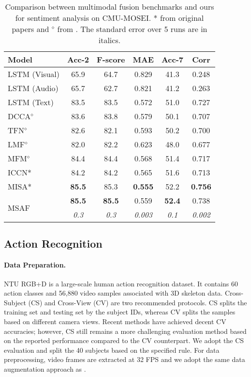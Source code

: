 \documentclass[10pt,twocolumn,letterpaper]{article}
\begin{document}
\begin{table}[t]
  \centering
  \small
    \begin{tabular}{lccccc}
      Model & Acc-2 & F-score & MAE & Acc-7 & Corr\\
      \hline
      LSTM (Visual) & 65.9 & 64.7 & 0.829 & 41.3 & 0.248\\
      LSTM (Audio) & 65.7 & 62.7 & 0.821 & 41.2 & 0.263\\
      LSTM (Text) & 83.5 & 83.5 & 0.572 & 51.0 & 0.727\\
      \hline
      DCCA$^\diamond$ & 83.6 & 83.8 & 0.579 & 50.1 & 0.707\\
      TFN$^\diamond$ & 82.6 & 82.1 & 0.593 & 50.2 & 0.700\\
      LMF$^\diamond$ & 82.0 & 82.2 & 0.623 & 48.0 & 0.677\\
      MFM$^\diamond$ & 84.4 & 84.4 & 0.568 & 51.4 & 0.717\\
      ICCN* & 84.2 & 84.2 & 0.565 & 51.6 & 0.713\\
      MISA* & \textbf{85.5} & 85.3 & \textbf{0.555} & 52.2 & \textbf{0.756}\\
      \hline
      \multirow{2}{*}{MSAF} & \textbf{85.5} & \textbf{85.5} & 0.559 & \textbf{52.4} & 0.738\\
      & \textit{0.3} & \textit{0.3} & \textit{0.003} & \textit{0.1} & \textit{0.002} \\
      \hline
    \end{tabular}
    \caption{Comparison between multimodal fusion benchmarks and ours for sentiment analysis on CMU-MOSEI. * from original papers and $^\diamond$ from \cite{sun2019learning}. The standard error over 5 runs are in italics.}
    \label{table2}
\end{table}

\subsection{Action Recognition}
\paragraph{Data Preparation.}
NTU RGB+D \cite{shahroudy2016ntu} is a large-scale human action recognition dataset. It contains 60 action classes and 56,880 video samples associated with 3D skeleton data. Cross-Subject (CS) and Cross-View (CV) are two recommended protocols. CS splits the training set and testing set by the subject IDs, whereas CV splits the samples based on different camera views. Recent methods \cite{yang2020feedback, liu2018recognizing, de2020infrared} have achieved decent CV accuracies; however, CS still remains a more challenging evaluation method based on the reported performance compared to the CV counterpart. We adopt the CS evaluation and split the 40 subjects based on the specified rule. For data preprocessing, video frames are extracted at 32 FPS and we adopt the same data augmentation approach as \cite{joze2020mmtm}. 
\end{document}
